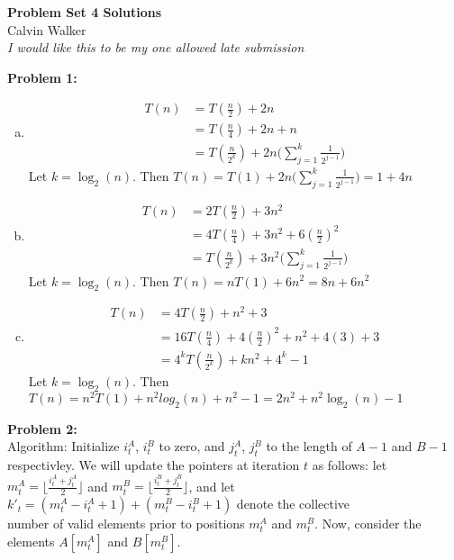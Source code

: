 \documentclass{article}
\begin{document}
\begin{center}
    \Large{\textbf{Problem Set 4 Solutions}} \\[0.25ex]
    Calvin Walker \\[0.5ex]
    \small{\textit{I would like this to be my one allowed late submission}}
\end{center}
\textbf{Problem 1:} 
\begin{enumerate}[a)]
    \item 
    \begin{align*}
        T(n) &= T(\frac{n}{2}) + 2n \\
        &= T(\frac{n}{4}) + 2n + n\\ 
        &= T(\frac{n}{2^k}) + 2n\bigg(\sum_{j = 1}^{k} \frac{1}{2^{j - 1}}\bigg) 
    \end{align*}
    Let $k = \log_2(n)$. Then $T(n) = T(1) + 2n\big(\sum_{j = 1}^{k} \frac{1}{2^{j - 1}}\big) = 1 + 4n$
    \item \begin{align*}
        T(n) &= 2T(\frac{n}{2}) + 3n^2 \\
        &= 4T(\frac{n}{4}) + 3n^2 + 6(\frac{n}{2})^2 \\
        &= T(\frac{n}{2^k}) + 3n^2\bigg(\sum_{j = 1}^{k}\frac{1}{2^{j - 1}}\bigg)
    \end{align*}
    Let $k = \log_2(n)$. Then $T(n) = n T(1) + 6n^2 = 8n + 6n^2$
    \item \begin{align*}
        T(n) &= 4T(\frac{n}{2}) + n^2 + 3 \\
        &= 16T(\frac{n}{4}) + 4(\frac{n}{2})^2 + n^2 + 4(3) + 3 \\
        &= 4^k T(\frac{n}{2^k}) + kn^2 + 4^{k} - 1
    \end{align*}
    Let $k = \log_2(n)$. Then $T(n) = n^2 T(1) + n^2log_2(n) + n^2 - 1 = 2n^2 + n^2 \log_2 (n) - 1$
\end{enumerate}
\textbf{Problem 2:} \\[0.5ex]
Algorithm: Initialize $i^A_t$, $i^B_t$ to zero, and $j^A_t$, $j^B_t$ to the length of $A - 1$ and $B - 1$ respectivley. We will update the pointers at iteration $t$ as follows: let $m^A_t = \lfloor \frac{i^A_t + j^A_t}{2} \rfloor$ and $m^B_t = \lfloor \frac{i^B_t + j^B_t}{2} \rfloor$, and let $k'_t = (m^A_t - i^A_t + 1) + (m^B_t - i^B_t + 1)$ denote 
the collective \\[0.5ex]number of valid elements prior to positions $m^A_t$ and $m^B_t$. Now, consider the elements $A[m^A_t]$ and $B[m^B_t]$. 
\end{document}
